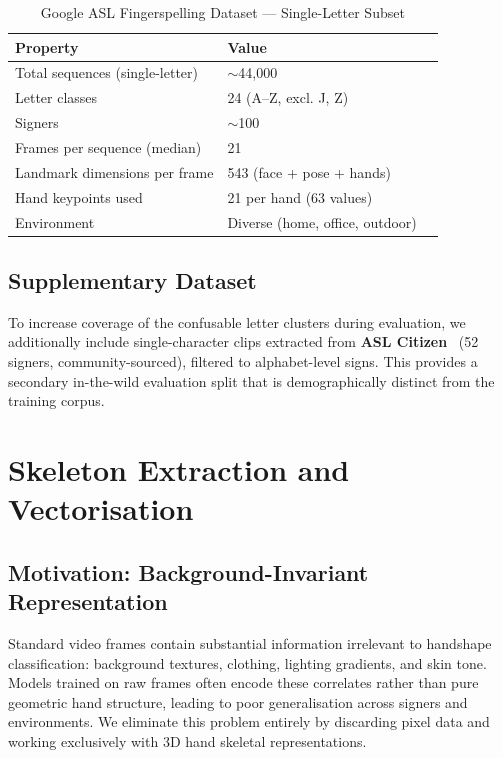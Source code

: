 \documentclass[conference]{IEEEtran}
\begin{document}
\begin{table}[htbp]
\caption{Google ASL Fingerspelling Dataset --- Single-Letter Subset}
\label{tab:datasetclass}
\centering
\renewcommand{\arraystretch}{1.15}
\begin{tabular}{lll}
\toprule
\textbf{Property} & \textbf{Value} \\
\midrule
Total sequences (single-letter)  & $\sim$44,000 \\
Letter classes                   & 24 (A--Z, excl. J, Z) \\
Signers                          & $\sim$100 \\
Frames per sequence (median)     & 21 \\
Landmark dimensions per frame    & 543 (face + pose + hands) \\
Hand keypoints used              & 21 per hand (63 values) \\
Environment                      & Diverse (home, office, outdoor) \\
\bottomrule
\end{tabular}
\end{table}

\subsection{Supplementary Dataset}

To increase coverage of the confusable letter clusters during evaluation, we
additionally include single-character clips extracted from \textbf{ASL
Citizen}~\cite{desai2023} (52 signers, community-sourced), filtered to
alphabet-level signs. This provides a secondary in-the-wild evaluation split
that is demographically distinct from the training corpus.

\section{Skeleton Extraction and Vectorisation}
\label{sec:preprocessing}

\subsection{Motivation: Background-Invariant Representation}

Standard video frames contain substantial information irrelevant to handshape
classification: background textures, clothing, lighting gradients, and skin
tone. Models trained on raw frames often encode these correlates rather than
pure geometric hand structure, leading to poor generalisation across signers and
environments. We eliminate this problem entirely by discarding pixel data and
working exclusively with 3D hand skeletal representations.
\end{document}
